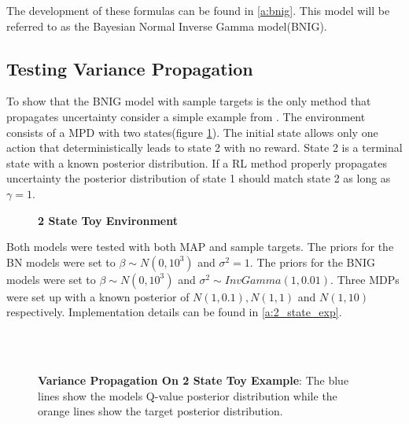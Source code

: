 The development of these formulas can be found in \ref{a:bnig}. This model will be referred to as the Bayesian Normal Inverse Gamma model(BNIG).

\subsection{Testing Variance Propagation}

To show that the BNIG model with sample targets is the only method that propagates uncertainty consider a simple example from \cite{osband_2018}. The environment consists of a MPD with two states(figure \ref{fig:2state}). The initial state allows only one action that deterministically leads to state 2 with no reward. State 2 is a terminal state with a known posterior distribution. If a RL method properly propagates uncertainty the posterior distribution of state 1 should match state 2 as long as $\gamma=1$. 

\begin{figure}[H]
    \centering
    \caption{\textbf{2 State Toy Environment}}
    \label{fig:2state}
\end{figure}

Both models were tested with both MAP and sample targets. The priors for the BN models were set to $\beta \sim N(0,10^3)$ and $\sigma^2 = 1$. The priors for the BNIG models were set to $\beta \sim N(0,10^3)$ and $\sigma^2 \sim InvGamma(1, 0.01)$. Three MDPs were set up with a known posterior of $N(1, 0.1), N(1, 1)$ and $N(1, 10)$ respectively. Implementation details can be found in \ref{a:2_state_exp}.

\begin{figure}[H]
    \centering
    \\
    \\
    \caption{\textbf{Variance Propagation On 2 State Toy Example}: The blue lines show the models Q-value posterior distribution while the orange lines show the target posterior distribution.}
    \label{fig:proptest}
\end{figure}

